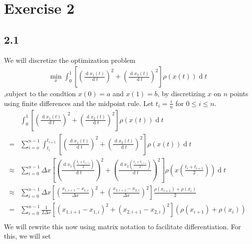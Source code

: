 \documentclass{article}
\DeclareMathOperator{\deriv}{d}
\begin{document}
\section{Exercise 2}
\subsection{2.1}
We will discretize the optimization problem
\begin{align*}
  \min_{x}\int_{0}^{1} \left[\left(\frac{\deriv x_1(t)}{\deriv t}\right)^{2}+ \left(\frac{\deriv x_2(t)}{\deriv t}\right)^{2} \right]\rho(x(t)) \deriv t
\end{align*}
,subject to the condtion $x(0)=a$ and $x(1)=b$,
by discretizing $x$ on $n$ points using finite differences and the midpoint rule.
Let $t_i=\frac{i}{n}$ for $0\leq i \leq n$. 
\begin{align*}
  &\int_{0}^{1} \left[\left(\frac{\deriv x_1(t)}{\deriv t}\right)^{2}+ \left(\frac{\deriv x_2(t)}{\deriv t}\right)^{2} \right]\rho\left(x\left(t\right)\right) \deriv t\\
=&\sum_{i=o}^{n-1}\int_{t_i}^{t_{i+1}} \left[\left(\frac{\deriv x_1(t)}{\deriv t}\right)^{2}+ \left(\frac{\deriv x_2(t)}{\deriv t}\right)^{2} \right]\rho\left(x\left(t\right)\right) \deriv t\\
\approx&\sum_{i=0}^{n-1} \Delta x  \left[\left(\frac{\deriv x_1(\frac{t_i+t_{i+1}}{2})}{\deriv t}\right)^{2}+ \left(\frac{\deriv x_2(\frac{t_i+t_{i+1}}{2})}{\deriv t}\right)^{2} \right]\rho\left(x\left(\frac{t_{i}+t_{i+1}}{2}\right)\right) \deriv t\\
\approx & \sum_{i=0}^{n-1}\Delta x \left[\left(\frac{x_{1,i+1}-x_{1,i}}{\Delta x}\right)^2+
\left(\frac{x_{2,i+1}-x_{2,i}}{\Delta x}\right)^2 \right]\frac{\rho(x_{i+1})+\rho(x_i)}{2}\\
= &  \sum_{i=0}^{n-1}\frac{1}{2\Delta x}\left[\left(x_{1,i+1}-x_{1,i}\right)^2+
\left(x_{2,i+1}-x_{2,i}\right)^2 \right]\left(\rho(x_{i+1})+\rho(x_i)\right)\\
\end{align*}
We will rewrite this now using  matrix notation to facilitate differentiation.
For this, we will set
\end{document}

